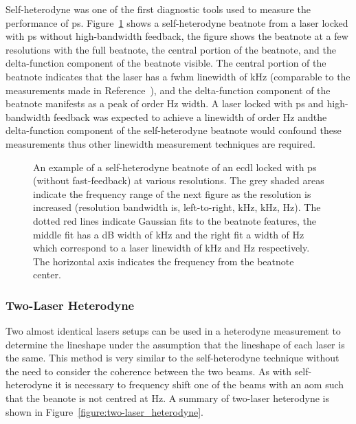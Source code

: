 Self-heterodyne was one of the first diagnostic tools used to measure the performance of \gls{ps}.
Figure~\ref{figure:self-heterodyne_example} shows a self-heterodyne beatnote from a laser locked with \gls{ps} without high-bandwidth feedback, the figure shows the beatnote at a few resolutions with the full beatnote, the central portion of the beatnote, and the delta-function component of the beatnote visible.
The central portion of the beatnote indicates that the laser has a \gls{fwhm} linewidth of \unit[33]{kHz} (comparable to the measurements made in Reference~\cite{torii_laser-phase_2012}), and the delta-function component of the beatnote manifests as a peak of order \unit[100]{Hz} width.
A laser locked with \gls{ps} and high-bandwidth feedback was expected to achieve a linewidth of order \unit[100]{Hz} andthe delta-function component of the self-heterodyne beatnote would confound these measurements thus other linewidth measurement techniques are required.

\begin{figure}
\center

\caption{An example of a self-heterodyne beatnote of an \gls{ecdl} locked with \gls{ps} (without fast-feedback) at various resolutions.
The grey shaded areas indicate the frequency range of the next figure as the resolution is increased (resolution bandwidth is, left-to-right, \unit[3]{kHz}, \unit[1]{kHz}, \unit[1]{Hz}).
The dotted red lines indicate Gaussian fits to the beatnote features, the middle fit has a \unit[3]{dB} width of \unit[77]{kHz} and the right fit a width of \unit[570]{Hz} which correspond to a laser linewidth of \unit[33]{kHz} and \unit[240]{Hz} respectively.
The horizontal axis indicates the frequency from the beatnote center.}
\label{figure:self-heterodyne_example}
\end{figure}

\subsubsection{Two-Laser Heterodyne}

Two almost identical lasers setups can be used in a heterodyne measurement to determine the lineshape under the assumption that the lineshape of each laser is the same.
This method is very similar to the self-heterodyne technique without the need to consider the coherence between the two beams.
As with self-heterodyne it is necessary to frequency shift one of the beams with an \gls{aom} such that the beanote is not centred at \unit[0]{Hz}.
A summary of two-laser heterodyne is shown in Figure~\ref{figure:two-laser_heterodyne}.


